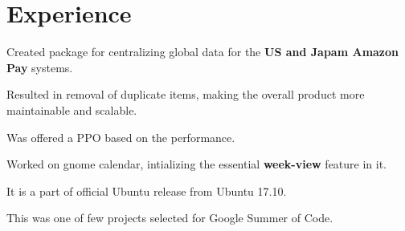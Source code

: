 \documentclass[letterpaper]{deedy-resume} %
\begin{document}
\hfill
%
%
\begin{minipage}[t]{0.66\textwidth} %


\section{Experience}


\vspace{\topsep} %
\begin{tightitemize}
\item Created package for centralizing global data for the \textbf{US and Japam Amazon Pay} systems.
\item Resulted in removal of duplicate items, making the overall product more maintainable and scalable.
\item Was offered a PPO based on the performance.
\end{tightitemize}

\sectionspace %



\begin{tightitemize}
\item Worked on gnome calendar, intializing the essential \textbf{week-view} feature in it.
\item It is a part of official Ubuntu release from Ubuntu 17.10.
\item This was one of few projects selected for Google Summer of Code.
\end{tightitemize}

\sectionspace %



\end{minipage}
\end{document}
